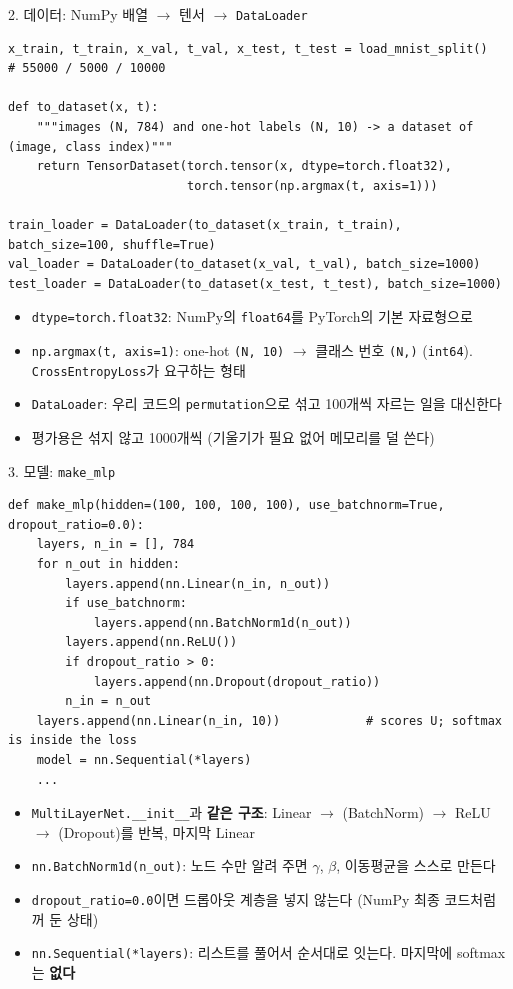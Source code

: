 \documentclass[aspectratio=169,11pt]{beamer}
\newcommand{\code}[1]{\texttt{#1}}
\begin{document}
\begin{frame}[fragile]{2. 데이터: NumPy 배열 $\to$ 텐서 $\to$ \code{DataLoader}}
\begin{lstlisting}
x_train, t_train, x_val, t_val, x_test, t_test = load_mnist_split()   # 55000 / 5000 / 10000

def to_dataset(x, t):
    """images (N, 784) and one-hot labels (N, 10) -> a dataset of (image, class index)"""
    return TensorDataset(torch.tensor(x, dtype=torch.float32),
                         torch.tensor(np.argmax(t, axis=1)))

train_loader = DataLoader(to_dataset(x_train, t_train), batch_size=100, shuffle=True)
val_loader = DataLoader(to_dataset(x_val, t_val), batch_size=1000)
test_loader = DataLoader(to_dataset(x_test, t_test), batch_size=1000)
\end{lstlisting}
\begin{itemize}
\item \code{dtype=torch.float32}: NumPy의 \code{float64}를 PyTorch의 기본 자료형으로
\item \code{np.argmax(t, axis=1)}: one-hot \code{(N, 10)} $\to$ 클래스 번호 \code{(N,)} (\code{int64}). \code{CrossEntropyLoss}가 요구하는 형태
\item \code{DataLoader}: 우리 코드의 \code{permutation}으로 섞고 100개씩 자르는 일을 대신한다
\item 평가용은 섞지 않고 1000개씩 (기울기가 필요 없어 메모리를 덜 쓴다)
\end{itemize}
\end{frame}

\begin{frame}{3. 모델: \code{make\_mlp}}
\small
\begin{lstlisting}
def make_mlp(hidden=(100, 100, 100, 100), use_batchnorm=True, dropout_ratio=0.0):
    layers, n_in = [], 784
    for n_out in hidden:
        layers.append(nn.Linear(n_in, n_out))
        if use_batchnorm:
            layers.append(nn.BatchNorm1d(n_out))
        layers.append(nn.ReLU())
        if dropout_ratio > 0:
            layers.append(nn.Dropout(dropout_ratio))
        n_in = n_out
    layers.append(nn.Linear(n_in, 10))            # scores U; softmax is inside the loss
    model = nn.Sequential(*layers)
    ...
\end{lstlisting}
\small
\begin{itemize}
\item \code{MultiLayerNet.\_\_init\_\_}과 \textbf{같은 구조}: Linear $\to$ (BatchNorm) $\to$ ReLU $\to$ (Dropout)를 반복, 마지막 Linear
\item \code{nn.BatchNorm1d(n\_out)}: 노드 수만 알려 주면 $\gamma$, $\beta$, 이동평균을 스스로 만든다
\item \code{dropout\_ratio=0.0}이면 드롭아웃 계층을 넣지 않는다 (NumPy 최종 코드처럼 꺼 둔 상태)
\item \code{nn.Sequential(*layers)}: 리스트를 풀어서 순서대로 잇는다. 마지막에 softmax는 \textbf{없다}
\end{itemize}
\end{frame}
\end{document}

